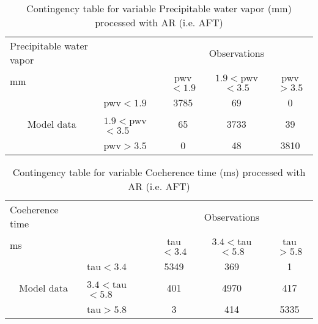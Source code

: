 \documentclass[11pt,english]{article}
\begin{document}
\begin{table}[]
\begin{center}
\begin{tabular}{llccc}
\hline
{Precipitable water vapor}                                       &                                                    & \multicolumn{3}{c}{Observations}                 \\
{mm}                                       &                             & pwv$<1.9$   & $1.9<$pwv$<3.5$ & pwv$>3.5$ \\
\hline
\multicolumn{1}{c}{\multirow{3}{*}{Model data}}  & pwv$<1.9$          & 3785                & 69                       & 0              \\
                                                 & $1.9<$pwv$<3.5$ & 65                & 3733                       & 39              \\
                                                 & pwv$>3.5$          & 0                & 48                       & 3810              \\
\hline
\end{tabular}
\end{center}
\caption{Contingency table for variable Precipitable water vapor (mm) processed with AR (i.e. AFT)}
\label{tab:contingency}
\end{table}

\begin{table}[]
\begin{center}
\begin{tabular}{llccc}
\hline
{Coeherence time}                                       &                                                    & \multicolumn{3}{c}{Observations}                 \\
{ms}                                       &                             & tau$<3.4$   & $3.4<$tau$<5.8$ & tau$>5.8$ \\
\hline
\multicolumn{1}{c}{\multirow{3}{*}{Model data}}  & tau$<3.4$          & 5349                & 369                       & 1              \\
                                                 & $3.4<$tau$<5.8$ & 401                & 4970                       & 417              \\
                                                 & tau$>5.8$          & 3                & 414                       & 5335              \\
\hline
\end{tabular}
\end{center}
\caption{Contingency table for variable Coeherence time (ms) processed with AR (i.e. AFT)}
\label{tab:contingency}
\end{table}
\end{document}
